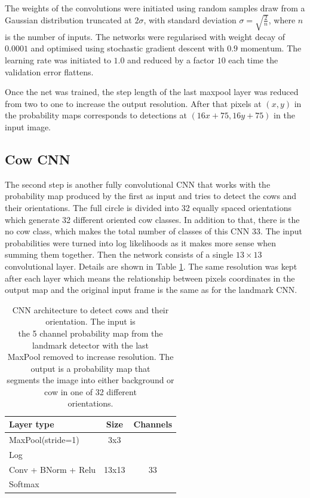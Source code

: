 \documentclass{cta-author}
\begin{document}
The weights of the convolutions were initiated using random samples draw from a Gaussian
distribution truncated at $2\sigma$, with standard deviation $\sigma=\sqrt{\frac{2}{n}}$,
where $n$ is the number of inputs\cite{DBLP:journals/corr/HeZR015}. The networks were regularised with weight 
decay of
$0.0001$ and optimised using stochastic gradient descent with $0.9$ momentum. The
learning rate was initiated to $1.0$ and reduced by a factor $10$ each time the validation
error flattens. 

Once the net was trained, the step length of the last maxpool layer was reduced from two to one to increase 
the output resolution. After that pixels at $\left(x, y\right)$ in the probability maps corresponds to 
detections at $\left(16 x + 75, 16 y + 75\right)$ in the input image.

\subsection{Cow CNN}

The second step is another fully convolutional CNN that works with the probability map produced by the first 
as input and tries to detect the cows and their orientations. The full circle is divided into 32 equally 
spaced orientations which generate 32 different oriented cow classes. In addition to that, there is the no 
cow class, which makes the total number of classes of this CNN 33. The input probabilities were turned into 
log likelihoods as it makes more sense when summing them together. Then the network consists of a single $ 13 
\times 13 $ convolutional layer. Details are shown in Table \ref{tab:cowdirnet}. The same resolution was kept 
after each layer which means the relationship between pixels coordinates in the output map and the original 
input frame is the same as for the landmark CNN.

\begin{table}
\begin{center}
\begin{tabular}{|l|c|c|}
\hline
\textbf{Layer type} & \textbf{Size} & \textbf{Channels} \\
\hline

MaxPool(stride=1) & 3x3 &  \\
Log & & \\
Conv + BNorm + Relu & 13x13 & 33 \\
Softmax & & \\
\hline
\end{tabular}
\end{center}
\caption{CNN architecture to detect
cows and their orientation. The input is \\
the 5 channel probability map from the landmark detector with the last \\
MaxPool removed to increase resolution. The output is a probability map that \\
segments the image into either background or cow in one of 32 different \\
orientations.
}
\label{tab:cowdirnet}
\end{table}
\end{document}
